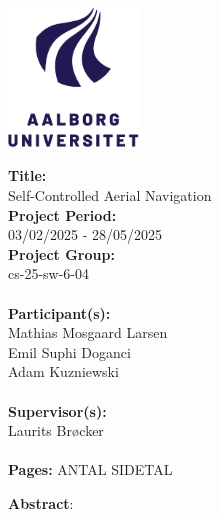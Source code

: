 

\begin{minipage}[t]{0.42\textwidth}
\vspace{-25pt}
\includegraphics[height=3.7cm]{7. Figures/AAU logo stor dansk.png}
\end{minipage}
\hfill
\begin{minipage}[t]{0.42\textwidth}
{}
\end{minipage}

\vspace*{1cm}

\begin{minipage}[t]{0.42\textwidth}
\textbf{Title:} \\[5pt] 
Self-Controlled Aerial Navigation \vspace*{0.25cm} \\

\textbf{Project Period:} \\[5pt]
03/02/2025 - 28/05/2025 \vspace*{0.25cm} \\

\textbf{Project Group:} \\[5pt]
cs-25-sw-6-04 \vspace*{0.25cm} \\
\\
\textbf{Participant(s):} \\[5pt]
Mathias Mosgaard Larsen \vspace*{0.25cm} \\
Emil Suphi Doganci \vspace*{0.25cm} \\
Adam Kuzniewski \vspace*{0.25cm} \\
\\
\textbf{Supervisor(s):} \\[5pt]
Laurits Brøcker \vspace*{0.25cm} \\
\\
\textbf{Pages:} ANTAL SIDETAL\\

\end{minipage}
\hfill
\begin{minipage}[t]{0.483\textwidth}
\textbf{Abstract}:\\[5pt]
\fbox{\parbox{7cm}{\bigskip\bigskip}}
\end{minipage}

\vfill
{\footnotesize\itshape }